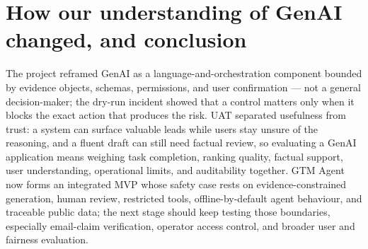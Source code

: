 \section{How our understanding of GenAI changed, and conclusion}

The project reframed GenAI as a language-and-orchestration component bounded by evidence
objects, schemas, permissions, and user confirmation --- not a general decision-maker;
the dry-run incident showed that a control matters only when it blocks the exact action
that produces the risk. UAT separated usefulness from trust: a system can surface
valuable leads while users stay unsure of the reasoning, and a fluent draft can still
need factual review, so evaluating a GenAI application means weighing task completion,
ranking quality, factual support, user understanding, operational limits, and
auditability together. GTM Agent now forms an integrated MVP whose safety case rests on
evidence-constrained generation, human review, restricted tools, offline-by-default
agent behaviour, and traceable public data; the next stage should keep testing those
boundaries, especially email-claim verification, operator access control, and broader
user and fairness evaluation.
